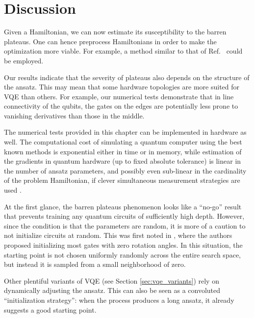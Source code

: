 \section{Discussion}
Given a Hamiltonian, we can now estimate its susceptibility to the barren plateaus. One can hence preprocess Hamiltonians in order to make the optimization more viable. For example, a method similar to that of Ref.~\cite{ryabinkin_iterative_2020} could be employed.

Our results indicate that the severity of plateaus also depends on the structure of the ansatz. This may mean that some hardware topologies are more suited for VQE than others. For example, our numerical tests demonstrate that in line connectivity of the qubits, the gates on the edges are potentially less prone to vanishing derivatives than those in the middle.

The numerical tests provided in this chapter can be implemented in hardware as well. The computational cost of simulating a quantum computer using the best known methods is exponential either in time or in memory, while estimation of the gradients in quantum hardware (up to fixed absolute tolerance) is linear in the number of ansatz parameters, and possibly even sub-linear in the cardinality of the problem Hamiltonian, if clever simultaneous measurement strategies are used \cite{verteletskyi_measurement_2020}. 

At the first glance, the barren plateaus phenomenon looks like a ``no-go'' result that prevents training any quantum circuits of sufficiently high depth. However, since the condition is that the parameters are random, it is more of a caution to not initialize circuits at random. This was first noted in \cite{grant_initialization_2019}, where the authors proposed initializing most gates with zero rotation angles. In this situation, the starting point is not chosen uniformly randomly across the entire search space, but instead it is sampled from a small neighborhood of zero. 

Other plentiful variants of VQE (see Section \ref{sec:vqe_variants}) rely on dynamically adjusting the ansatz. This can also be seen as a convoluted ``initialization strategy'': when the process produces a long ansatz, it already suggests a good starting point. 

